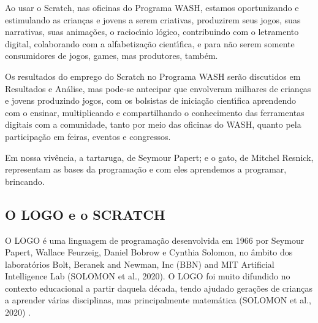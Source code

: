 \documentclass[
12pt,		%
openright,	%
twoside,  %
a4paper,			%
chapter=TITLE,		%
english,			%
french,				%
spanish,			%
brazil				%
]{USPSC-classe/USPSC}
\begin{document}
Ao usar o Scratch, nas oficinas do Programa WASH, estamos oportunizando e estimulando \textquotedbl as crian\c{c}as e jovens a serem criativas, produzirem seus jogos, suas narrativas, suas anima\c{c}\~oes, o racioc\'{\i}nio l\'ogico, contribuindo com o letramento digital, colaborando com a alfabetiza\c{c}\~ao cient\'{\i}fica, e para n\~ao serem somente consumidores de jogos, games, mas produtores, tamb\'em\textquotedbl .










Os resultados do emprego do Scratch no Programa WASH ser\~ao discutidos em Resultados e An\'alise, mas pode-se antecipar que envolveram milhares de crian\c{c}as e jovens produzindo jogos, com os bolsistas de inicia\c{c}\~ao cient\'{\i}fica aprendendo com o ensinar, multiplicando e compartilhando o conhecimento das ferramentas digitais  com a comunidade, tanto por meio das oficinas do WASH, quanto pela participa\c{c}\~ao em feiras, eventos e congressos.










Em nossa viv\^encia, a tartaruga, de Seymour Papert; e o gato, de Mitchel Resnick,  representam as bases da  programa\c{c}\~ao e com eles aprendemos a  programar,  brincando.










\subsection[O LOGO e o SCRATCH]{O LOGO e o SCRATCH}\label{O LOGO e o SCRATCH}
O LOGO \'e uma linguagem de programa\c{c}\~ao desenvolvida em 1966 por Seymour Papert, Wallace Feurzeig, Daniel Bobrow e Cynthia Solomon, no \^ambito dos laborat\'orios Bolt, Beranek and Newman, Inc (BBN) and MIT Artificial Intelligence Lab (SOLOMON et al., 2020). O LOGO foi muito difundido no contexto educacional a partir daquela d\'ecada, tendo ajudado gera\c{c}\~oes de crian\c{c}as a aprender v\'arias disciplinas, mas principalmente matem\'atica  (SOLOMON et al., 2020) .
\end{document}
